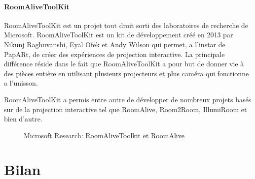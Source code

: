 \paragraph{RoomAliveToolKit} RoomAliveToolKit\cite{Jones:2014:RME:2642918.2647383} est un projet tout droit sorti des laboratoires de recherche de Microsoft. RoomAliveToolKit est un kit de développement créé en 2013 par Nikunj Raghuvanshi, Eyal Ofek et Andy Wilson qui permet, a l'instar de PapARt, de créer des expériences de projection interactive. La principale différence réside dans le fait que RoomAliveToolKit a pour but de donner vie à des pièces entière en utilisant plusieurs projecteurs et plus caméra qui fonctionne a l'unisson.

RoomAliveToolKit a permis entre autre de développer de nombreux projets basés sur de la projection interactive tel que RoomAlive, Room2Room, IllumiRoom et bien d'autre.

\begin{figure}[H]
    \centering
\caption{Microsoft Research: RoomAliveToolkit et RoomAlive}
\label{fig:STAR}
\end{figure}



\section{Bilan}